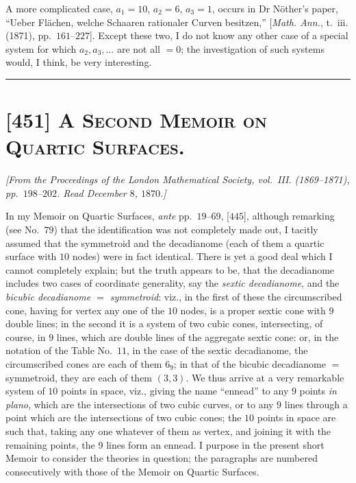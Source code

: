 \documentclass[11pt,a4paper]{article}
\begin{document}
\medskip

A more complicated case, $a_1 = 10$, $a_2 = 6$, $a_3 = 1$, occurs in
Dr N\"other's paper, ``Ueber Fl\"achen, welche Schaaren rationaler Curven
besitzen,'' [\textit{Math. Ann.}, t.~iii. (1871), pp.~$161$--$227$]. Except
these two, I do not know any other case of a special system for which
$a_2, a_3, \dotsc$ are not all $= 0$; the investigation of such systems
would, I think, be very interesting.

\medskip


\bigskip
\hrule
\bigskip

\section*{[451] \textsc{A Second Memoir on Quartic Surfaces.}}

\begin{center}
\textit{[From the Proceedings of the London Mathematical Society, vol.\ III.
(1869--1871), pp.\ $198$--$202$. Read December $8$, $1870$.]}
\end{center}

\medskip

In my Memoir on Quartic Surfaces, \textit{ante} pp.~$19$--$69$, [$445$],
although remarking (see No.~$79$) that the identification was not completely
made out, I tacitly assumed that the symmetroid and the decadianome (each
of them a quartic surface with $10$ nodes) were in fact identical. There is
yet a good deal which I cannot completely explain; but the truth appears to
be, that the decadianome includes two cases of coordinate generality, say
the \textit{sextic decadianome}, and the \textit{bicubic decadianome
$=$ symmetroid}: viz., in the first of these the circumscribed cone, having
for vertex any one of the $10$ nodes, is a proper sextic cone with $9$
double lines; in the second it is a system of two cubic cones, intersecting,
of course, in $9$ lines, which are double lines of the aggregate sextic
cone: or, in the notation of the Table No.~$11$, in the case of the sextic
decadianome, the circumscribed cones are each of them $6_9$; in that of the
bicubic decadianome $=$ symmetroid, they are each of them $(3, 3)$. We
thus arrive at a very remarkable system of $10$ points in space, viz.,
giving the name ``ennead'' to any $9$ points \textit{in plano}, which are
the intersections of two cubic curves, or to any $9$ lines through a point
which are the intersections of two cubic cones; the $10$ points in space
are such that, taking any one whatever of them as vertex, and joining it
with the remaining points, the $9$ lines form an ennead. I purpose in the
present short Memoir to consider the theories in question; the paragraphs
are numbered consecutively with those of the Memoir on Quartic Surfaces.
\end{document}
